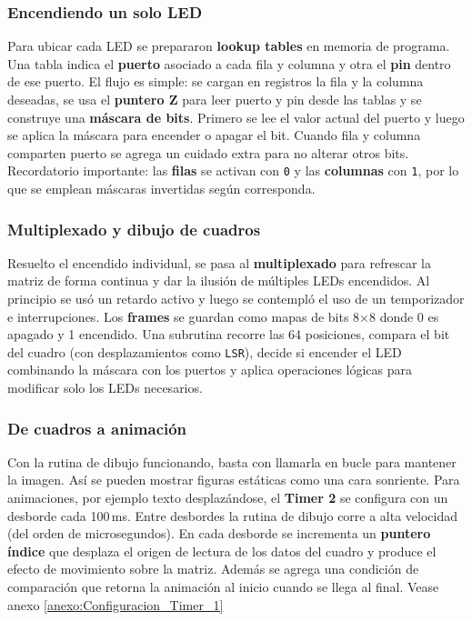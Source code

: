 \subsubsection{Encendiendo un solo LED}
Para ubicar cada LED se prepararon \textbf{lookup tables} en memoria de programa. Una tabla indica el \textbf{puerto} asociado a cada fila y columna y otra el \textbf{pin} dentro de ese puerto. El flujo es simple: se cargan en registros la fila y la columna deseadas, se usa el \textbf{puntero Z} para leer puerto y pin desde las tablas y se construye una \textbf{máscara de bits}. Primero se lee el valor actual del puerto y luego se aplica la máscara para encender o apagar el bit. Cuando fila y columna comparten puerto se agrega un cuidado extra para no alterar otros bits. Recordatorio importante: las \textbf{filas} se activan con \texttt{0} y las \textbf{columnas} con \texttt{1}, por lo que se emplean máscaras invertidas según corresponda.

\subsubsection{Multiplexado y dibujo de cuadros}
Resuelto el encendido individual, se pasa al \textbf{multiplexado} para refrescar la matriz de forma continua y dar la ilusión de múltiples LEDs encendidos. Al principio se usó un retardo activo y luego se contempló el uso de un temporizador e interrupciones. Los \textbf{frames} se guardan como mapas de bits 8×8 donde 0 es apagado y 1 encendido. Una subrutina recorre las 64 posiciones, compara el bit del cuadro (con desplazamientos como \texttt{LSR}), decide si encender el LED combinando la máscara con los puertos y aplica operaciones lógicas para modificar solo los LEDs necesarios.

\subsubsection{De cuadros a animación}
Con la rutina de dibujo funcionando, basta con llamarla en bucle para mantener la imagen. Así se pueden mostrar figuras estáticas como una cara sonriente. Para animaciones, por ejemplo texto desplazándose, el \textbf{Timer 2} se configura con un desborde cada 100\,ms. Entre desbordes la rutina de dibujo corre a alta velocidad (del orden de microsegundos). En cada desborde se incrementa un \textbf{puntero índice} que desplaza el origen de lectura de los datos del cuadro y produce el efecto de movimiento sobre la matriz. Además se agrega una condición de comparación que retorna la animación al inicio cuando se llega al final. Vease anexo \ref{anexo:Configuracion_Timer_1}


